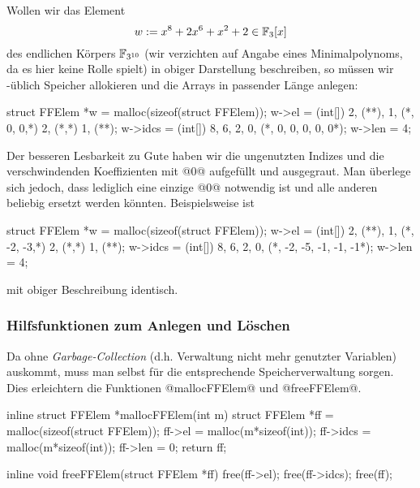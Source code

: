 \begin{beispiel}
  Wollen wir das Element 
  \[ w := x^8 + 2x^6 + x^2 + 2 \in \mathbb{F}_3[x]\]
  des endlichen Körpers $\mathbb{F}_{3^{10}}$ 
  (wir verzichten auf Angabe eines Minimalpolynoms, da es hier keine
  Rolle spielt) in obiger Darstellung beschreiben, so müssen wir \Clang-üblich
  Speicher allokieren und die Arrays in passender Länge anlegen:
  \begin{cexample}
    struct FFElem *w = malloc(sizeof(struct FFElem));
    w->el = (int[]) {2, (**), 1, (*, 0, 0,*) 2, (*,*) 1, (**)};
    w->idcs = (int[]) {8, 6, 2, 0, (*, 0, 0, 0, 0, 0*)};
    w->len = 4;
  \end{cexample}
  Der besseren Lesbarkeit zu Gute haben wir die ungenutzten Indizes und die 
  verschwindenden Koeffizienten mit @0@ aufgefüllt und ausgegraut. 
  Man überlege sich jedoch,
  dass lediglich eine einzige @0@ notwendig ist und alle anderen 
  beliebig ersetzt werden könnten. Beispielsweise ist
  \begin{cexample}
    struct FFElem *w = malloc(sizeof(struct FFElem));
    w->el = (int[]) {2, (**), 1, (*, -2, -3,*) 2, (*,*) 1, (**)};
    w->idcs = (int[]) {8, 6, 2, 0, (*, -2, -5, -1, -1, -1*)};
    w->len = 4;
  \end{cexample}
  mit obiger Beschreibung identisch.
\end{beispiel}


\subsubsection{Hilfsfunktionen zum Anlegen und Löschen}

Da \Clang ohne \emph{Garbage-Collection} (d.h. Verwaltung nicht mehr genutzter
Variablen) auskommt, muss man selbst für die
entsprechende Speicherverwaltung sorgen. Dies erleichtern die Funktionen
@mallocFFElem@ und @freeFFElem@.

\begin{ccode}[caption={[\texttt{FFElem *mallocFFElem} aus 
 \url{../Sage/enumeratePCNs.c}]Aus \url{../Sage/enumeratePCNs.c}}]
inline struct FFElem *mallocFFElem(int m){
    struct FFElem *ff = malloc(sizeof(struct FFElem));
    ff->el = malloc(m*sizeof(int));
    ff->idcs = malloc(m*sizeof(int));
    ff->len = 0;
    return ff;
}
\end{ccode}

\begin{ccode}[caption={[\texttt{void freeFFElem} aus 
 \url{../Sage/enumeratePCNs.c}]Aus \url{../Sage/enumeratePCNs.c}}]
inline void freeFFElem(struct FFElem *ff){
    free(ff->el);
    free(ff->idcs);
    free(ff);
}
\end{ccode}

